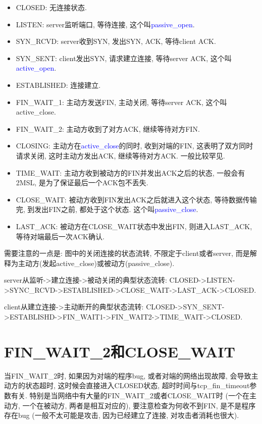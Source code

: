{    \begin{itemize}
    \item {CLOSED: 无连接状态.}
    \item {LISTEN: server监听端口, 等待连接, 这个叫\textcolor{blue}{passive\_open}.}
    \item {SYN\_RCVD: server收到SYN, 发出SYN, ACK, 等待client ACK.}
    \item {SYN\_SENT: client发出SYN, 请求建立连接, 等待server ACK, 这个叫\textcolor{blue}{active\_open}.}
    \item {ESTABLISHED: 连接建立. }
    \item {FIN\_WAIT\_1: 主动方发送FIN, 主动关闭, 等待server ACK, 这个叫active\_close. }
    \item {FIN\_WAIT\_2: 主动方收到了对方ACK, 继续等待对方FIN.}
    \item {CLOSING: 主动方在\textcolor{blue}{active\_close}的同时, 收到对端的FIN, 这表明了双方同时请求关闭, 这时主动方发出ACK, 继续等待对方ACK. 一般比较罕见. }
    \item {TIME\_WAIT: 主动方收到被动方的FIN并发出ACK之后的状态, 一般会有2MSL, 是为了保证最后一个ACK包不丢失.}
    \item {CLOSE\_WAIT: 被动方收到FIN发出ACK之后就进入这个状态, 等待数据传输完, 到发出FIN之前, 都处于这个状态. 这个叫\textcolor{blue}{passive\_close}. }
    \item {LAST\_ACK: 被动方在CLOSE\_WAIT状态中发出FIN, 则进入LAST\_ACK, 等待对端最后一次ACK确认.}
    \end{itemize}\par

    {需要注意的一点是: 图中的关闭连接的状态流转, 不限定于client或者server, 而是解释为主动方(发起active\_close)或被动方(passive\_close). }\par
    {server从监听->建立连接->被动关闭的典型状态流转: CLOSED->LISTEN->SYNC\_RCVD->ESTABLISHED->CLOSE\_WAIT->LAST\_ACK->CLOSED. }\par
    {client从建立连接->主动断开的典型状态流转: CLOSED->SYN\_SENT->ESTABLISHD->FIN\_WAIT1->FIN\_WAIT2->TIME\_WAIT->CLOSED. }\par
}

\section {\ZHH FIN\_WAIT\_2和CLOSE\_WAIT} {
    {当FIN\_WAIT\_2时, 如果因为对端的程序bug, 或者对端的网络出现故障, 会导致主动方的状态超时, 这时候会直接进入CLOSED状态, 超时时间与tcp\_fin\_timeout参数有关. 特别是当网络中有大量的FIN\_WAIT\_2或者CLOSE\_WAIT时 (一个在主动方, 一个在被动方, 两者是相互对应的), 要注意检查为何收不到FIN, 是不是程序存在bug (一般不太可能是攻击, 因为已经建立了连接, 对攻击者消耗也很大).}\par
}

